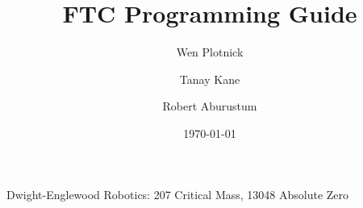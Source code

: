 \documentclass[12pt,reqno,toc=sectionentrywithdots,toc=indent]{article}
\author{Wen Plotnick \and Tanay Kane \and Robert Aburustum}
\title{FTC Programming Guide} %
\date{\today}
\theoremstyle{break}
\begin{document}
\hypersetup{linkcolor=lapislazuli}

\maketitle
\thispagestyle{fancy}
\vspace*{-0.25in}
\centerline{Dwight-Englewood Robotics: 207 Critical Mass, 13048 Absolute Zero}
\vspace*{0.15in}
\setcounter{tocdepth}{3}
\tableofcontents
\newpage




\end{document}
